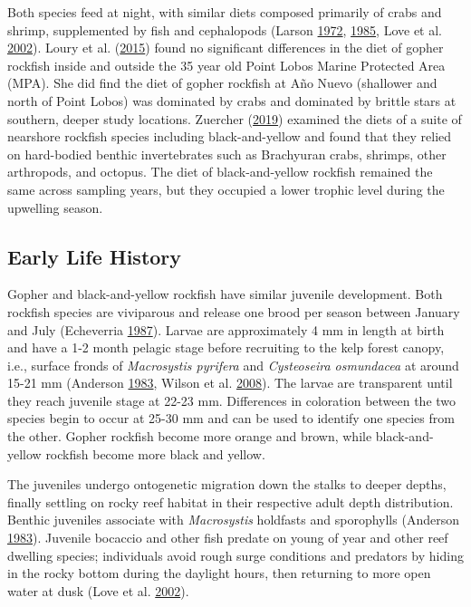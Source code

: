 \documentclass[12pt,]{article}
\begin{document}
Both species feed at night, with similar diets composed primarily of
crabs and shrimp, supplemented by fish and cephalopods (Larson
\protect\hyperlink{ref-Larson1972}{1972},
\protect\hyperlink{ref-Hallacher1985}{1985}, Love et al.
\protect\hyperlink{ref-Love2002}{2002}). Loury et al.
(\protect\hyperlink{ref-Loury2015}{2015}) found no significant
differences in the diet of gopher rockfish inside and outside the 35
year old Point Lobos Marine Protected Area (MPA). She did find the diet
of gopher rockfish at Año Nuevo (shallower and north of Point Lobos) was
dominated by crabs and dominated by brittle stars at southern, deeper
study locations. Zuercher (\protect\hyperlink{ref-Zuercher2019}{2019})
examined the diets of a suite of nearshore rockfish species including
black-and-yellow and found that they relied on hard-bodied benthic
invertebrates such as Brachyuran crabs, shrimps, other arthropods, and
octopus. The diet of black-and-yellow rockfish remained the same across
sampling years, but they occupied a lower trophic level during the
upwelling season.

\subsection{Early Life History}\label{early-life-history}

Gopher and black-and-yellow rockfish have similar juvenile development.
Both rockfish species are viviparous and release one brood per season
between January and July (Echeverria
\protect\hyperlink{ref-Echeverria1987}{1987}). Larvae are approximately
4 mm in length at birth and have a 1-2 month pelagic stage before
recruiting to the kelp forest canopy, i.e., surface fronds of
\emph{Macrosystis pyrifera} and \emph{Cysteoseira osmundacea} at around
15-21 mm (Anderson \protect\hyperlink{ref-Anderson1983}{1983}, Wilson et
al. \protect\hyperlink{ref-Wilson2008}{2008}). The larvae are
transparent until they reach juvenile stage at 22-23 mm. Differences in
coloration between the two species begin to occur at 25-30 mm and can be
used to identify one species from the other. Gopher rockfish become more
orange and brown, while black-and-yellow rockfish become more black and
yellow.

The juveniles undergo ontogenetic migration down the stalks to deeper
depths, finally settling on rocky reef habitat in their respective adult
depth distribution. Benthic juveniles associate with \emph{Macrosystis}
holdfasts and sporophylls (Anderson
\protect\hyperlink{ref-Anderson1983}{1983}). Juvenile bocaccio and other
fish predate on young of year and other reef dwelling species;
individuals avoid rough surge conditions and predators by hiding in the
rocky bottom during the daylight hours, then returning to more open
water at dusk (Love et al. \protect\hyperlink{ref-Love2002}{2002}).
\end{document}
